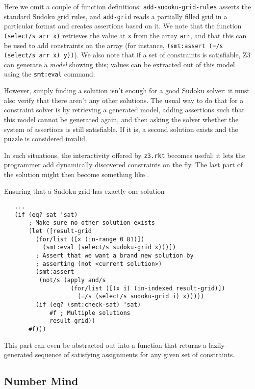 Here we omit a couple of function definitions: \texttt{add-sudoku-grid-rules}
asserts the standard Sudoku grid rules, and \texttt{add-grid} reads a
partially filled grid in a particular format and creates assertions based on
it. We note that the function \texttt{(select/s arr x)} retrieves the value at
\texttt{x} from the array \texttt{arr}, and that this can be used to add
constraints on the array (for instance, \texttt{(smt:assert (=/s (select/s arr
x) y))}). We also note that if a set of constraints is satisfiable, Z3 can
generate a \textit{model} showing this; values can be extracted out of this
model using the \texttt{smt:eval} command.

However, simply finding a solution isn't enough for a good Sudoku solver: it
must also verify that there aren't any other solutions. The usual way to do
that for a constraint solver is by retrieving a generated model, adding
assertions such that this model cannot be generated again, and then asking the
solver whether the system of assertions is still satisfiable. If it is, a
second solution exists and the puzzle is considered invalid.

In such situations, the interactivity offered by \texttt{z3.rkt} becomes
useful: it lets the programmer add dynamically discovered constraints on the
fly. The last part of the solution might then become something like
.

\begin{program}
\caption{Ensuring that a Sudoku grid has exactly one solution}
\label{fig:sudoku-unique}
\begin{verbatim}
   ...
   (if (eq? sat 'sat)
       ; Make sure no other solution exists
       (let ([result-grid
         (for/list ([x (in-range 0 81)])
           (smt:eval (select/s sudoku-grid x)))])
         ; Assert that we want a brand new solution by
         ; asserting (not <current solution>)
         (smt:assert
          (not/s (apply and/s
                   (for/list ([(x i) (in-indexed result-grid)])
                     (=/s (select/s sudoku-grid i) x)))))
         (if (eq? (smt:check-sat) 'sat)
             #f ; Multiple solutions
             result-grid))
       #f)))
\end{verbatim}
\end{program}

This part can even be abstracted out into a function that returns a
lazily-generated sequence of satisfying assignments for any given set of
constraints.

\subsection{Number Mind}

